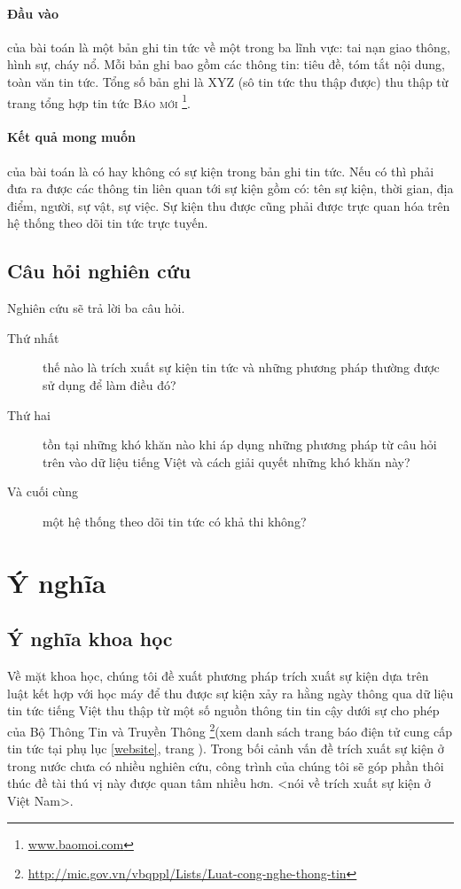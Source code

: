 \paragraph{Đầu vào} của bài toán là một bản ghi tin tức về một trong  ba lĩnh vực: tai nạn giao thông, hình sự, cháy nổ. Mỗi bản ghi bao gồm các thông tin: tiêu đề, tóm tắt nội dung, toàn văn tin tức. Tổng số bản ghi là XYZ (sô tin tức thu thập được) thu thập từ trang tổng hợp tin tức \textsc{Báo mới} \footnote{\href{www.baomoi.com}{www.baomoi.com}}.

\paragraph{Kết quả mong muốn} của bài toán là có hay không có sự kiện trong bản ghi tin tức. Nếu có thì phải đưa ra được các thông tin liên quan tới sự kiện gồm có: tên sự kiện, thời gian, địa điểm, người, sự vật, sự việc. Sự kiện thu được cũng phải được trực quan hóa trên hệ thống theo dõi tin tức trực tuyến.
    \subsection{Câu hỏi nghiên cứu}
 \noindent Nghiên cứu sẽ trả lời ba câu hỏi.
 \begin{description}
 \item[Thứ nhất] thế nào là trích xuất sự kiện tin tức và những phương pháp thường được sử dụng để làm điều đó?
\item[Thứ hai] tồn tại những khó khăn nào  khi áp dụng những phương pháp từ câu hỏi trên vào dữ liệu tiếng Việt và cách giải quyết những khó khăn này?
\item[Và cuối cùng] một hệ thống theo dõi tin tức có khả thi không?
 \end{description}

\section{Ý nghĩa}
    \label{meaning}
    \subsection{Ý nghĩa khoa học}

\noindent Về mặt khoa học, chúng tôi đề xuất phương pháp trích xuất sự kiện dựa trên luật kết hợp với học máy để thu được sự kiện xảy ra hằng ngày thông qua  dữ liệu tin tức tiếng Việt thu thập từ một số nguồn thông tin tin cậy dưới sự cho phép của Bộ Thông Tin và Truyền Thông \footnote{\href{http://mic.gov.vn/vbqppl/Lists/Vn$\%$20bn$\%$20QPPL/DispForm.aspx?ID=6988}{http://mic.gov.vn/vbqppl/Lists/Luat-cong-nghe-thong-tin}}(xem danh sách trang báo điện tử cung cấp tin tức tại  phụ lục \ref{website}, trang \pageref{website}). Trong bối cảnh vấn đề trích xuất sự kiện ở trong nước chưa có nhiều nghiên cứu, công trình của chúng tôi sẽ góp phần thôi thúc đề tài thú vị này được quan tâm nhiều hơn.
<nói về trích xuất sự kiện ở Việt Nam>.
